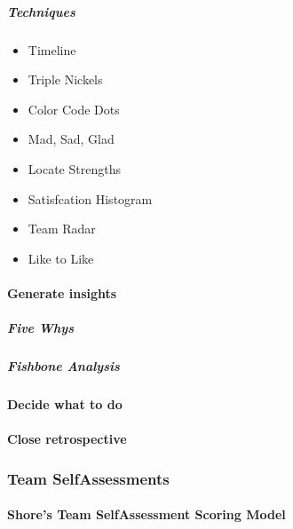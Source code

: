 \documentclass[letterpaper,10pt,english]{jupyterBook}
\begin{document}
\subparagraph{Techniques}
\label{\detokenize{APM/agile:techniques}}\begin{itemize}
\item {} 
\sphinxAtStartPar
Timeline

\item {} 
\sphinxAtStartPar
Triple Nickels

\item {} 
\sphinxAtStartPar
Color Code Dots

\item {} 
\sphinxAtStartPar
Mad, Sad, Glad

\item {} 
\sphinxAtStartPar
Locate Strengths

\item {} 
\sphinxAtStartPar
Satisfcation Histogram

\item {} 
\sphinxAtStartPar
Team Radar

\item {} 
\sphinxAtStartPar
Like to Like

\end{itemize}


\paragraph{Generate insights}
\label{\detokenize{APM/agile:generate-insights}}

\subparagraph{Five Whys}
\label{\detokenize{APM/agile:five-whys}}

\subparagraph{Fishbone Analysis}
\label{\detokenize{APM/agile:fishbone-analysis}}

\paragraph{Decide what to do}
\label{\detokenize{APM/agile:decide-what-to-do}}

\paragraph{Close retrospective}
\label{\detokenize{APM/agile:close-retrospective}}

\subsubsection{Team Self\sphinxhyphen{}Assessments}
\label{\detokenize{APM/agile:team-self-assessments}}

\paragraph{Shore’s Team Self\sphinxhyphen{}Assessment Scoring Model}
\label{\detokenize{APM/agile:shore-s-team-self-assessment-scoring-model}}
\end{document}
